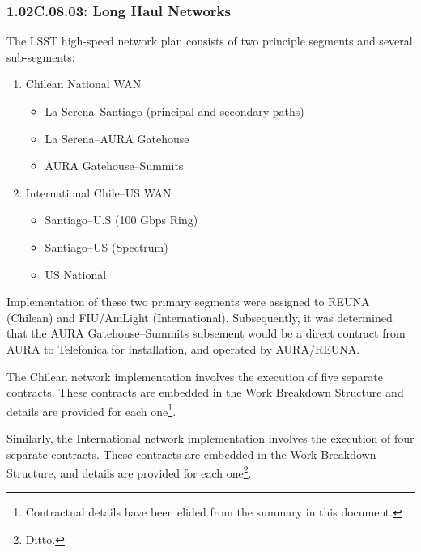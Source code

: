 \subsubsection{1.02C.08.03: Long Haul Networks}

The LSST high-speed network plan consists of two principle segments and
several sub-segments:

\begin{enumerate}
  \item{Chilean National WAN

    \begin{itemize}
      \item{La Serena--Santiago (principal and secondary paths)}
      \item{La Serena--AURA Gatehouse}
      \item{AURA Gatehouse--Summits}
    \end{itemize}
  }

  \item{International Chile--US WAN

    \begin{itemize}
      \item{Santiago--U.S (100 Gbps Ring)}
      \item{Santiago--US (Spectrum)}
      \item{US National}
    \end{itemize}
  }
\end{enumerate}

Implementation of these two primary segments were assigned to REUNA (Chilean)
and FIU/AmLight (International). Subsequently, it was determined that the AURA
Gatehouse--Summits subsement would be a direct contract from AURA to
Telefonica for installation, and operated by AURA/REUNA.

The Chilean network implementation involves the execution of five separate
contracts. These contracts are embedded in the Work Breakdown Structure and
details are provided for each one\footnote{Contractual details have been
elided from the summary in this document.}.

Similarly, the International network implementation involves the execution of
four separate contracts. These contracts are embedded in the Work Breakdown
Structure, and details are provided for each one\footnote{Ditto.}.
